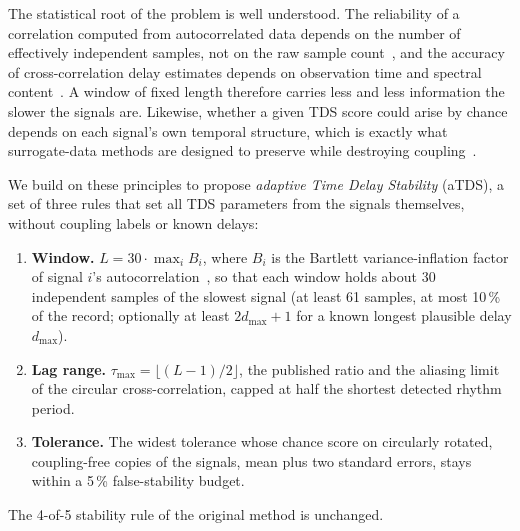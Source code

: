 \documentclass[11pt,a4paper]{article}
\begin{document}
The statistical root of the problem is well understood. The reliability of a correlation computed from autocorrelated data depends on the number of effectively independent samples, not on the raw sample count~\cite{Bartlett1946TheoreticalSpecification,Bayley1946EffectiveNumber,Pyper1998ComparisonMethods,Afyouni2019EffectiveDegrees}, and the accuracy of cross-correlation delay estimates depends on observation time and spectral content~\cite{Knapp1976GeneralizedCorrelation,Carter1987CoherenceTime}. A window of fixed length therefore carries less and less information the slower the signals are. Likewise, whether a given TDS score could arise by chance depends on each signal's own temporal structure, which is exactly what surrogate-data methods are designed to preserve while destroying coupling~\cite{Theiler1992TestingNonlinearity,Schreiber2000SurrogateTime,Lancaster2018SurrogateData}.

We build on these principles to propose \emph{adaptive Time Delay Stability} (aTDS), a set of three rules that set all TDS parameters from the signals themselves, without coupling labels or known delays:
\begin{enumerate}
\item \textbf{Window.} $L = 30 \cdot \max_i B_i$, where $B_i$ is the Bartlett variance-inflation factor of signal $i$'s autocorrelation~\cite{Bartlett1946TheoreticalSpecification}, so that each window holds about 30 independent samples of the slowest signal (at least 61 samples, at most 10\,\% of the record; optionally at least $2 d_{\max} + 1$ for a known longest plausible delay $d_{\max}$).
\item \textbf{Lag range.} $\tau_{\max} = \lfloor (L-1)/2 \rfloor$, the published ratio and the aliasing limit of the circular cross-correlation, capped at half the shortest detected rhythm period.
\item \textbf{Tolerance.} The widest tolerance whose chance score on circularly rotated, coupling-free copies of the signals, mean plus two standard errors, stays within a 5\,\% false-stability budget.
\end{enumerate}
The 4-of-5 stability rule of the original method is unchanged.
\end{document}
